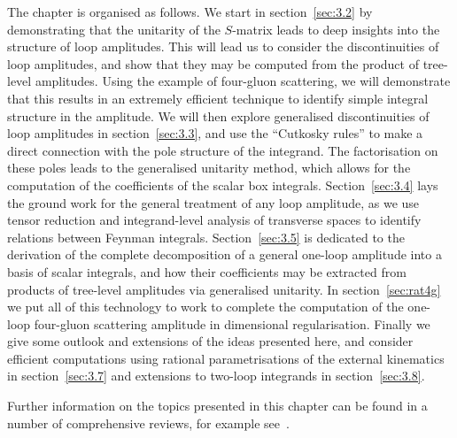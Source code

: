 The chapter is organised as follows. We start in section~\ref{sec:3.2} by
demonstrating that the unitarity of the $S$-matrix leads to deep insights into
the structure of loop amplitudes. This will lead us to consider the
discontinuities of loop amplitudes, and show that they may be computed from the
product of tree-level amplitudes. Using the example of four-gluon scattering, we will demonstrate that this results in an extremely efficient technique to
identify simple integral structure in the amplitude. We will then explore
generalised discontinuities of loop amplitudes in section~\ref{sec:3.3}, and use
the ``Cutkosky rules'' to make a direct connection with the pole structure of the
integrand. The factorisation on these poles leads to the generalised unitarity
method, which allows for the computation of the coefficients of the
scalar box integrals. Section~\ref{sec:3.4} lays the ground work for the
general treatment of any loop amplitude, as we use tensor reduction and
integrand-level analysis of transverse spaces to identify relations between
Feynman integrals. Section~\ref{sec:3.5} is dedicated to the derivation of the
complete decomposition of a general one-loop amplitude into a basis of scalar
integrals, and how their coefficients may be extracted from products of
tree-level amplitudes via generalised unitarity. In section~\ref{sec:rat4g} we
put all of this technology to work to complete the computation of the one-loop four-gluon scattering amplitude
in dimensional regularisation. Finally we give some outlook and extensions of
the ideas presented here, and consider efficient computations using rational
parametrisations of the external kinematics in section~\ref{sec:3.7} and
extensions to two-loop integrands in section~\ref{sec:3.8}.

Further information on the topics presented in this chapter can be found in a number of comprehensive reviews, for example see~\cite{ch3_Dixon:1996wi,ch3_Dixon:2013uaa,ch3_Ellis:2011cr}.

